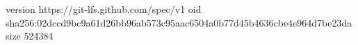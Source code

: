 version https://git-lfs.github.com/spec/v1
oid sha256:02dccd9bc9a61d26bb96ab573c95aac6504a0b77d45b4636cbe4e964d7be23da
size 524384
